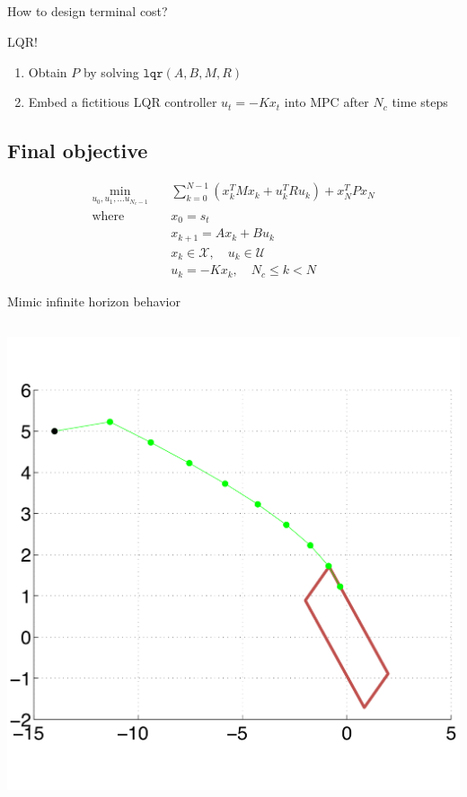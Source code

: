 \documentclass[
  letterpaper,
  DIV=11,
  numbers=noendperiod,
  oneside]{scrartcl}
\providecommand{\tightlist}{%
  \setlength{\itemsep}{0pt}\setlength{\parskip}{0pt}}\usepackage{longtable,booktabs,array}
\begin{document}
\subsection{}\label{section-34}

How to design terminal cost?

LQR!

\begin{enumerate}
\def\labelenumi{\arabic{enumi}.}
\tightlist
\item
  Obtain \(P\) by solving \(\texttt{lqr}(A, B, M, R)\)
\item
  Embed a fictitious LQR controller \(u_t = -K x_t\) into MPC after
  \(N_c\) time steps
\end{enumerate}

\subsection{Final objective}\label{final-objective}

\begin{align}
\min_{u_0, u_1, \ldots u_{N_c - 1}} \quad & \sum_{k=0}^{N-1} \left( x_{k}^{T} M x_k +  u_{k}^{T} R u_k \right) + x_{N}^{T} P x_{N}\\
\text{where }\quad & x_0 = s_t \\
& x_{k+1} = A x_k + B u_k \\
& x_k \in \mathcal{X},\quad u_k \in \mathcal{U} \\
& u_{k} = -K x_k,\quad N_c \leq k < N
\end{align}

Mimic infinite horizon behavior

\subsection{}\label{section-35}

\begin{center}
\includegraphics{figs/cl.gif}
\end{center}
\end{document}
